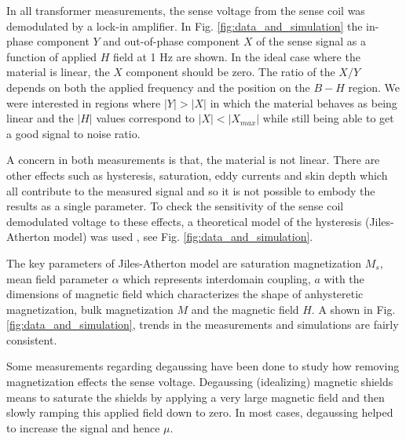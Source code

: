 \documentclass[review]{elsarticle}
\begin{document}
In all transformer measurements, the sense voltage from the sense coil was demodulated by a lock-in amplifier. In Fig. \ref{fig:data_and_simulation} the in-phase component $Y$ and out-of-phase component $X$ of the sense signal as a function of applied $H$ field at 1 Hz are shown. In the ideal case where the material is linear, the $X$ component should be zero. The ratio of the $X/Y$ depends on both the applied frequency and the position on the $B-H$ region. We were interested in regions where $\vert Y \vert > \vert X \vert $ in which the material behaves as being linear and the $\vert H \vert $ values correspond to $\vert X \vert < \vert X_{max} \vert$ while still being able to get a good signal to noise ratio.


A concern in both measurements is that, the material is not linear. There are other effects such as hysteresis, saturation, eddy currents and skin depth which all contribute to the measured signal and so it is not possible to embody the results as a single parameter. 
To check the sensitivity of the sense coil demodulated voltage to these effects, a theoretical model of the hysteresis (Jiles-Atherton model) was used \cite{bib:jiles}, see Fig.  \ref{fig:data_and_simulation}. 

The key parameters of Jiles-Atherton model are saturation magnetization $M_s$, mean field parameter $\alpha$ which represents interdomain coupling, $a$ with the dimensions of magnetic field which characterizes the shape of anhysteretic magnetization, bulk magnetization $M$ and the magnetic field $H$. A shown in Fig. \ref{fig:data_and_simulation}, trends in the measurements and simulations are fairly consistent.

Some measurements regarding degaussing have been done to study how removing magnetization effects the sense voltage. Degaussing (idealizing) magnetic shields means to saturate the shields by applying a very large magnetic field and then slowly ramping this applied field down to zero. In most cases, degaussing helped to increase the signal and hence $\mu$.
\end{document}
